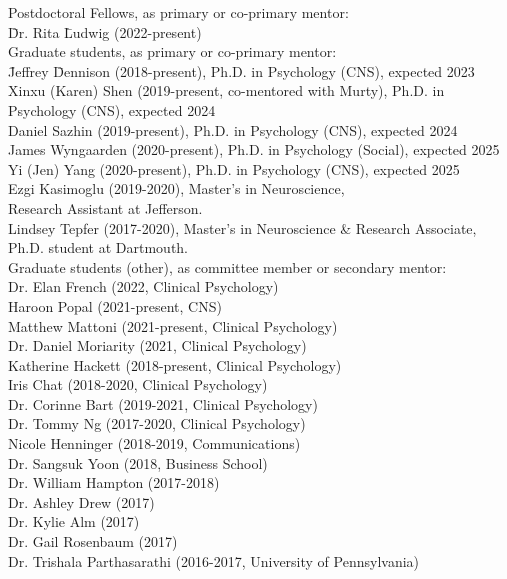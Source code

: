 \documentclass[11pt, letterpaper]{article}
\begin{document}
\begin{tabbing}
Postdoctoral Fellows, as primary or co-primary mentor: \\  [.1cm]
\hspace{.5in} \= Dr. Rita \= Ludwig (2022-present) \\ [.2cm]

Graduate students, as primary or co-primary mentor: \\  [.1cm]
\hspace{.5in} \= Jeffrey \= Dennison (2018-present), Ph.D. in Psychology (CNS), expected 2023 \\
\> Xinxu (Karen) Shen (2019-present, co-mentored with Murty), Ph.D. in Psychology (CNS), expected 2024 \\
\> Daniel Sazhin (2019-present), Ph.D. in Psychology (CNS), expected 2024 \\
\> James Wyngaarden (2020-present), Ph.D. in Psychology (Social), expected 2025 \\
\> Yi (Jen) Yang (2020-present), Ph.D. in Psychology (CNS), expected 2025 \\
\> Ezgi Kasimoglu (2019-2020), Master's in Neuroscience, \\ 
\> \> Research Assistant at Jefferson. \\
\> Lindsey Tepfer (2017-2020), Master's in Neuroscience \& Research Associate, \\
\> \> Ph.D. student at Dartmouth. \\ [.2cm]

Graduate students (other), as committee member or secondary mentor: \\  [.1cm]
\> Dr. Elan French (2022, Clinical Psychology) \\
\> Haroon Popal (2021-present, CNS) \\
\> Matthew Mattoni (2021-present, Clinical Psychology) \\
\> Dr. Daniel Moriarity (2021, Clinical Psychology) \\
\> Katherine Hackett (2018-present, Clinical Psychology) \\
\> Iris Chat (2018-2020, Clinical Psychology) \\
\> Dr. Corinne Bart (2019-2021, Clinical Psychology) \\
\> Dr. Tommy Ng (2017-2020, Clinical Psychology) \\
\> Nicole Henninger (2018-2019, Communications) \\
\> Dr. Sangsuk Yoon (2018, Business School) \\
\> Dr. William Hampton (2017-2018) \\
\> Dr. Ashley Drew (2017) \\
\> Dr. Kylie Alm (2017) \\
\> Dr. Gail Rosenbaum (2017) \\
\> Dr. Trishala Parthasarathi (2016-2017, University of Pennsylvania) \\ [.2cm]


\end{tabbing}
\end{document}
